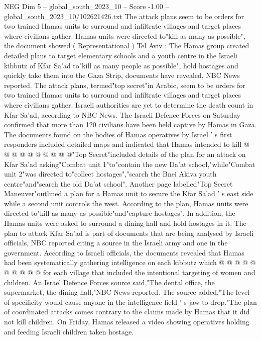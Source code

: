 \begin{textsample}{NEG Dim 5 – global\_south\_2023\_10 – Score -1.00 – global\_south\_2023\_10/102621426.txt}  \label{ex:f5_neg_063}
The attack plans seem to be orders for two trained Hamas units to surround and infiltrate villages and target places where civilians gather.
Hamas units were directed to"kill as many as possible", the document showed ( Representational ) Tel Aviv : The Hamas group created detailed plans to target elementary schools and a youth centre in the Israeli kibbutz of Kfar Sa'ad to"kill as many people as possible", hold hostages and quickly take them into the Gaza Strip, documents have revealed, NBC News reported.
The attack plans, termed"top secret"in Arabic, seem to be orders for two trained Hamas units to surround and infiltrate villages and target places where civilians gather.
Israeli authorities are yet to determine the death count in Kfar Sa'ad, according to NBC News.
The Israeli Defence Forces on Saturday confirmed that more than 120 civilians have been held captive by Hamas in Gaza.
The documents found on the bodies of Hamas operatives by Israel ' s first responders included detailed maps and indicated that Hamas intended to kill @ @ @ @ @ @ @ @ @ @"Top Secret"included details of the plan for an attack on Kfar Sa'ad asking"Combat unit 1"to"contain the new Da'at school,"while"Combat unit 2"was directed to"collect hostages","search the Bnei Akiva youth centre"and"search the old Da'at school".
Another page labelled"Top Secret Maneuver"outlined a plan for a Hamas unit to secure the Kfar Sa'ad ' s east side while a second unit controls the west.
According to the plan, Hamas units were directed to"kill as many as possible"and"capture hostages".
In addition, the Hamas units were asked to surround a dining hall and hold hostages in it.
The plan to attack Kfar Sa'ad is part of documents that are being analysed by Israeli officials, NBC reported citing a source in the Israeli army and one in the government.
According to Israeli officials, the documents revealed that Hamas had been systematically gathering intelligence on each kibbutz which @ @ @ @ @ @ @ @ @ @ for each village that included the intentional targeting of women and children.
An Israel Defence Forces source said,"The dental office, the supermarket, the dining hall,"NBC News reported.
The source added,"The level of specificity would cause anyone in the intelligence field ' s jaw to drop."The plan of coordinated attacks comes contrary to the claims made by Hamas that it did not kill children.
On Friday, Hamas released a video showing operatives holding and feeding Israeli children taken hostage.

\end{textsample}
